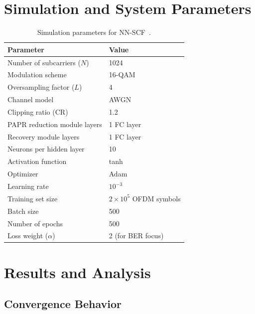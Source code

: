 \section{Simulation and System Parameters}
\label{sec:nnscf_params}

\begin{table}[H]
    \centering
    \caption{Simulation parameters for NN-SCF~\cite{zou2021novel}.}
    \label{tab:nnscf_params}
    \begin{tabular}{@{} l l @{}}
        \toprule
        \textbf{Parameter} & \textbf{Value} \\
        \midrule
        Number of subcarriers ($N$) & 1024 \\
        Modulation scheme & 16-QAM \\
        Oversampling factor ($L$) & 4 \\
        Channel model & AWGN \\
        Clipping ratio (CR) & 1.2 \\
        PAPR reduction module layers & 1 FC layer \\
        Recovery module layers & 1 FC layer \\
        Neurons per hidden layer & 10 \\
        Activation function & tanh \\
        Optimizer & Adam \\
        Learning rate & $10^{-3}$ \\
        Training set size & $2 \times 10^5$ OFDM symbols \\
        Batch size & 500 \\
        Number of epochs & 500 \\
        Loss weight ($\alpha$) & 2 (for BER focus) \\
        \bottomrule
    \end{tabular}
\end{table}


\section{Results and Analysis}
\label{sec:nnscf_results}

\subsection{Convergence Behavior}

